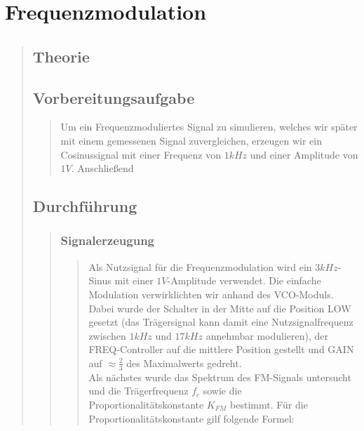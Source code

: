 


\section{Frequenzmodulation}
\begin{quote}
    \subsection{Theorie}
    \begin{quote}
    \end{quote}
    
    \subsection{Vorbereitungsaufgabe}
    \begin{quote}
        Um ein Frequenzmoduliertes Signal zu simulieren, welches wir später mit einem gemessenen Signal zuvergleichen,
        erzeugen wir ein Cosinussignal mit einer Frequenz von $1kHz$ und einer Amplitude von $1V$. Anschließend
    \end{quote}
    
    \subsection{Durchführung}
    \begin{quote}
        \subsubsection{Signalerzeugung}
        \begin{quote}
        Als Nutzsignal für die Frequenzmodulation wird ein $3 kHz$-Sinus mit
        einer $1 V$-Amplitude verwendet. Die einfache Modulation verwirklichten
        wir anhand des VCO-Moduls. Dabei wurde der Schalter in der Mitte auf
        die Position LOW gesetzt (das Trägersignal kann damit eine
        Nutzsignalfrequenz zwischen $1 kHz$ und $17 kHz$ annehmbar modulieren),
        der FREQ-Controller auf die mittlere Position gestellt und GAIN auf
        $\approx \frac{2}{3}$ des Maximalwerts gedreht.\\
        Als nächstes wurde das Spektrum des FM-Signals untersucht und die
        Trägerfrequenz $f_c$ sowie die Proportionalitätskonstante $K_{FM}$
        bestimmt. Für die Proportionalitätskonstante gilf folgende Formel:
        

\end{quote}
\end{quote}
\end{quote}
